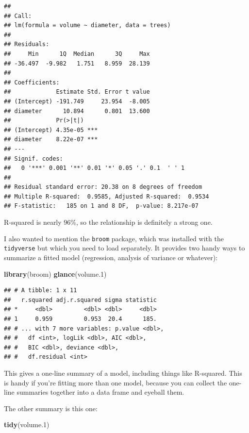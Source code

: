 \documentclass[]{tufte-book}
\newenvironment{Shaded}{}{}
\newcommand{\FloatTok}[1]{\textcolor[rgb]{0.25,0.63,0.44}{#1}}
\newcommand{\KeywordTok}[1]{\textcolor[rgb]{0.00,0.44,0.13}{\textbf{#1}}}
\newcommand{\NormalTok}[1]{#1}
\theoremstyle{definition}
\theoremstyle{definition}
\theoremstyle{definition}
\theoremstyle{remark}
\begin{document}
\begin{verbatim}
## 
## Call:
## lm(formula = volume ~ diameter, data = trees)
## 
## Residuals:
##     Min      1Q  Median      3Q     Max 
## -36.497  -9.982   1.751   8.959  28.139 
## 
## Coefficients:
##             Estimate Std. Error t value
## (Intercept) -191.749     23.954  -8.005
## diameter      10.894      0.801  13.600
##             Pr(>|t|)    
## (Intercept) 4.35e-05 ***
## diameter    8.22e-07 ***
## ---
## Signif. codes:  
##   0 '***' 0.001 '**' 0.01 '*' 0.05 '.' 0.1  ' ' 1
## 
## Residual standard error: 20.38 on 8 degrees of freedom
## Multiple R-squared:  0.9585, Adjusted R-squared:  0.9534 
## F-statistic:   185 on 1 and 8 DF,  p-value: 8.217e-07
\end{verbatim}

R-squared is nearly 96\%, so the relationship is definitely a strong
one.

I also wanted to mention the \texttt{broom} package, which was installed
with the \texttt{tidyverse} but which you need to load separately. It
provides two handy ways to summarize a fitted model (regression,
analysis of variance or whatever):

\begin{Shaded}
\begin{Highlighting}[]
\KeywordTok{library}\NormalTok{(broom)}
\KeywordTok{glance}\NormalTok{(volume}\FloatTok{.1}\NormalTok{)}
\end{Highlighting}
\end{Shaded}

\begin{verbatim}
## # A tibble: 1 x 11
##   r.squared adj.r.squared sigma statistic
## *     <dbl>         <dbl> <dbl>     <dbl>
## 1     0.959         0.953  20.4      185.
## # ... with 7 more variables: p.value <dbl>,
## #   df <int>, logLik <dbl>, AIC <dbl>,
## #   BIC <dbl>, deviance <dbl>,
## #   df.residual <int>
\end{verbatim}

This gives a one-line summary of a model, including things like
R-squared. This is handy if you're fitting more than one model, because
you can collect the one-line summaries together into a data frame and
eyeball them.

The other summary is this one:

\begin{Shaded}
\begin{Highlighting}[]
\KeywordTok{tidy}\NormalTok{(volume}\FloatTok{.1}\NormalTok{)}
\end{Highlighting}
\end{Shaded}
\end{document}
